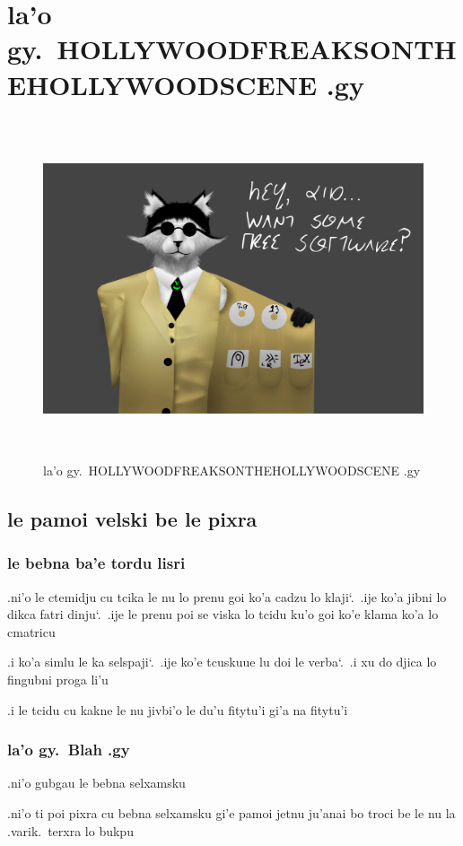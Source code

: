\documentclass{report}
\newcommand\imageheight{10cm}
\newcommand\sds{\spacefactor\sfcode`.\ \space}
\begin{document}
\chapter{la'o gy.\ HOLLYWOODFREAKSONTHEHOLLYWOODSCENE .gy}
\begin{figure}[ht]
	\centering
	\includegraphics[height=\imageheight]{hollywoodfreaksonthehollywoodscene/hollywoodfreaksonthehollywoodscene.png}
	\caption[center]{la'o gy.\ HOLLYWOODFREAKSONTHEHOLLYWOODSCENE .gy}
\end{figure}
\section{le pamoi velski be le pixra}
\subsection{le bebna ba'e tordu lisri}
.ni'o le ctemidju cu tcika le nu lo prenu goi ko'a cadzu lo klaji\sds  .ije ko'a jibni lo dikca fatri dinju\sds  .ije le prenu poi se viska lo tcidu ku'o goi ko'e klama ko'a lo cmatricu

.i ko'a simlu le ka selspaji\sds  .ije ko'e tcuskuue lu doi le verba\sds  .i xu do djica lo fingubni proga li'u

.i le tcidu cu kakne le nu jivbi'o le du'u fitytu'i gi'a na fitytu'i

\subsection{la'o gy.\ Blah .gy}
.ni'o gubgau le bebna selxamsku

.ni'o ti poi pixra cu bebna selxamsku gi'e pamoi jetnu ju'anai bo troci be le nu la .varik.\ terxra lo bukpu
\end{document}
